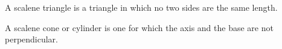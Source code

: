 A scalene triangle is a triangle in which no two sides are the same length.
\par
A scalene cone or cylinder is one for which the axis and the base
are not perpendicular.